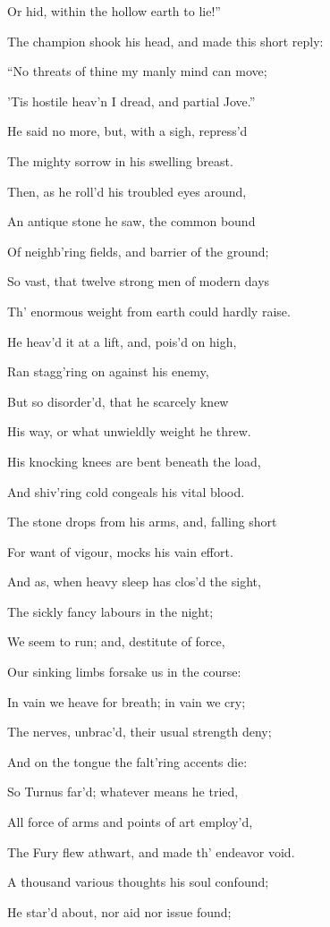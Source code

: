 Or hid, within the hollow earth to lie!”

The champion shook his head, and made this short reply:

“No threats of thine my manly mind can move;

’Tis hostile heav’n I dread, and partial Jove.”

He said no more, but, with a sigh, repress’d

The mighty sorrow in his swelling breast.

Then, as he roll’d his troubled eyes around,

An antique stone he saw, the common bound

Of neighb’ring fields, and barrier of the ground;

So vast, that twelve strong men of modern days

Th’ enormous weight from earth could hardly raise.

He heav’d it at a lift, and, pois’d on high,

Ran stagg’ring on against his enemy,

But so disorder’d, that he scarcely knew

His way, or what unwieldly weight he threw.

His knocking knees are bent beneath the load,

And shiv’ring cold congeals his vital blood.

The stone drops from his arms, and, falling short

For want of vigour, mocks his vain effort.

And as, when heavy sleep has clos’d the sight,

The sickly fancy labours in the night;

We seem to run; and, destitute of force,

Our sinking limbs forsake us in the course:

In vain we heave for breath; in vain we cry;

The nerves, unbrac’d, their usual strength deny;

And on the tongue the falt’ring accents die:

So Turnus far’d; whatever means he tried,

All force of arms and points of art employ’d,

The Fury flew athwart, and made th’ endeavor void.

A thousand various thoughts his soul confound;

He star’d about, nor aid nor issue found;

